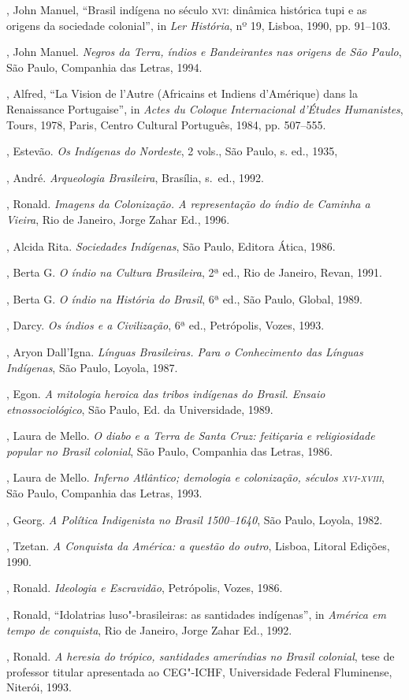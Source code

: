 \begin{bibliohedra}
, John Manuel, ``Brasil indígena no século \textsc{xvi}: dinâmica
histórica tupi e as origens da sociedade colonial'', in \textit{Ler
História}, nº 19, Lisboa, 1990, pp. 91--103.

, John Manuel. \textit{Negros da Terra, índios e Bandeirantes
nas origens de São Paulo}, São Paulo, Companhia das Letras, 1994.

, Alfred, ``La Vision de l'Autre (Africains et Indiens
d'Amérique) dans la Renaissance Portugaise'', in \textit{Actes du
Coloque Internacional d'Études Humanistes}, Tours, 1978, Paris, Centro
Cultural Português, 1984, pp. 507--555. 

, Estevão. \textit{Os Indígenas do Nordeste}, 2 vols.,
São Paulo, s. ed., 1935,

, André. \textit{Arqueologia Brasileira}, Brasília, s.~ed., 1992.

, Ronald. \textit{Imagens da Colonização. A representação do
índio de Caminha a Vieira}, Rio de Janeiro, Jorge Zahar Ed.,
1996. 

, Alcida Rita. \textit{Sociedades Indígenas}, São Paulo, Editora
Ática, 1986.

, Berta G. \textit{O índio na Cultura Brasileira}, 2ª ed., Rio
de Janeiro, Revan, 1991.

, Berta G. \textit{O índio na História do Brasil}, 6ª ed., São
Paulo, Global, 1989.

, Darcy. \textit{Os índios e a Civilização}, 6ª ed.,
Petrópolis, Vozes, 1993.

, Aryon Dall'Igna. \textit{Línguas Brasileiras. Para o
Conhecimento das Línguas Indígenas}, São Paulo, Loyola, 1987.

, Egon. \textit{A mitologia heroica das tribos indígenas do
Brasil. Ensaio etnossociológico}, São Paulo, Ed. da Universidade, 1989.

, Laura de Mello. \textit{O diabo e a Terra de Santa Cruz:
feitiçaria e religiosidade popular no Brasil colonial}, São Paulo,
Companhia das Letras, 1986.

, Laura de Mello. \textit{Inferno Atlântico; demologia e
colonização, séculos \textsc{xvi}-\textsc{xviii}}, São Paulo, Companhia das Letras, 1993.

, Georg. \textit{A Política Indigenista no Brasil 1500--1640}, 
São Paulo, Loyola, 1982.

, Tzetan. \textit{A Conquista da América: a questão do outro}, 
Lisboa, Litoral Edições, 1990.

, Ronald. \textit{Ideologia e Escravidão}, Petrópolis, Vozes,
1986.

, Ronald, ``Idolatrias luso"-brasileiras: as santidades
indígenas'', in \textit{América em tempo de conquista}, Rio de Janeiro,
Jorge Zahar Ed., 1992.

, Ronald. \textit{A heresia do trópico, santidades ameríndias
no Brasil colonial}, tese de professor titular apresentada ao CEG"-ICHF,
Universidade Federal Fluminense, Niterói, 1993.
\end{bibliohedra}
 



